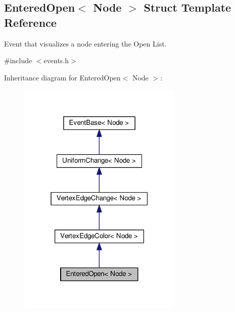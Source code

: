 \hypertarget{structEnteredOpen}{}\subsection{Entered\+Open$<$ Node $>$ Struct Template Reference}
\label{structEnteredOpen}


Event that visualizes a node entering the Open List.  




{\ttfamily \#include $<$events.\+h$>$}



Inheritance diagram for Entered\+Open$<$ Node $>$\+:\nopagebreak
\begin{figure}[H]
\begin{center}
\leavevmode
\includegraphics[width=223pt]{structEnteredOpen__inherit__graph}
\end{center}
\end{figure}


